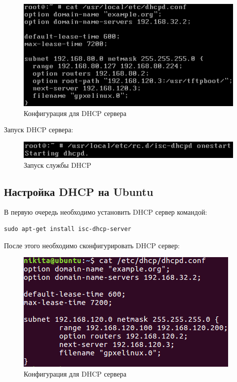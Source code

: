 \documentclass[14pt,a4paper,report]{report}
\begin{document}
\begin{figure}[h!]
	\centering
	\includegraphics[scale = 1.1]{images/1_1.png}
	\caption{Конфигурация для DHCP сервера}
	\label{image:3}
\end{figure}

Запуск DHCP сервера:

\begin{figure}[h!]
	\centering
	\includegraphics[scale = 1.1]{images/1_2.png}
	\caption{Запуск службы DHCP}
	\label{image:4}
\end{figure}

\subsection{Настройка DHCP на Ubuntu}

В первую очередь необходимо установить DHCP сервер командой:

\begin{lstlisting}
sudo apt-get install isc-dhcp-server
\end{lstlisting}

\clearpage

После этого необходимо сконфигурировать DHCP сервер:

\begin{figure}[h!]
	\centering
	\includegraphics[scale = 0.87]{images/2_0.png}
	\caption{Конфигурация для DHCP сервера}
	\label{image:5}
\end{figure}
\end{document}
